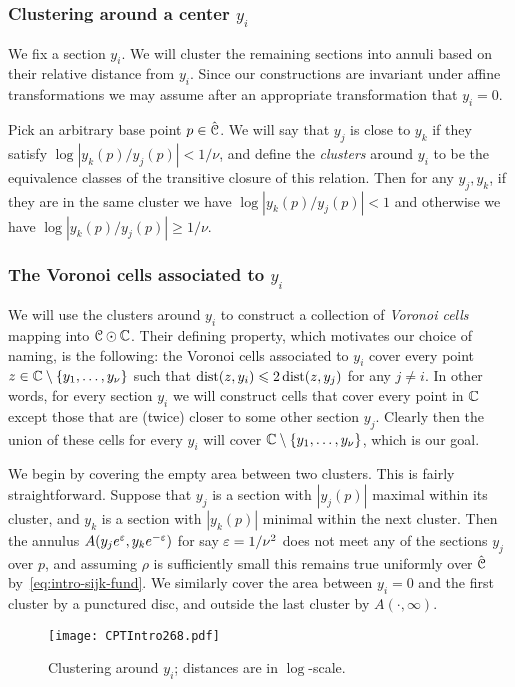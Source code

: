 \documentclass[reqno]{amsart}
\renewcommand\ge{\geqslant} \renewcommand\le{\leqslant}
\renewcommand\~[1]{\widetilde{#1}}
\begin{document}
\subsubsection{Clustering around a center $y_i$}

We fix a section $y_i$. We will cluster the remaining sections into
annuli based on their relative distance from $y_i$. Since our
constructions are invariant under affine transformations we may assume
after an appropriate transformation that $y_i=0$.

Pick an arbitrary base point $p\in\hat{{\mathcal C}}$. We will say that $y_j$ is
close to $y_k$ if they satisfy $\log|y_k(p)/y_j(p)|<1/\nu$, and define
the \emph{clusters} around $y_i$ to be the equivalence classes of the
transitive closure of this relation. Then for any $y_j,y_k$, if they
are in the same cluster we have $\log|y_k(p)/y_j(p)|<1$ and otherwise
we have $\log|y_k(p)/y_j(p)|\ge1/\nu$.
  
\subsubsection{The Voronoi cells associated to $y_i$}

We will use the clusters around $y_i$ to construct a collection of
\emph{Voronoi cells} mapping into ${\mathcal C}\odot{\mathbb C}$. Their defining
property, which motivates our choice of naming, is the following: the
Voronoi cells associated to $y_i$ cover every point
$z\in{\mathbb C}\setminus\{y_1,\ldots,y_\nu\}$ such that
$\dist(z,y_i)\le 2\dist(z,y_j)$ for any $j\neq i$. In other words, for
every section $y_i$ we will construct cells that cover every point in
${\mathbb C}$ except those that are (twice) closer to some other section
$y_j$. Clearly then the union of these cells for every $y_i$ will
cover ${\mathbb C}\setminus\{y_1,\ldots,y_\nu\}$, which is our goal.

We begin by covering the empty area between two clusters. This is
fairly straightforward. Suppose that $y_j$ is a section with
$|y_j(p)|$ maximal within its cluster, and $y_k$ is a section with
$|y_k(p)|$ minimal within the next cluster. Then the annulus
$A(y_je^\varepsilon,y_ke^{-\varepsilon})$ for say $\varepsilon=1/\nu^2$ does not meet any of the
sections $y_j$ over $p$, and assuming $\rho$ is sufficiently small
this remains true uniformly over $\hat{{\mathcal C}}$
by~\eqref{eq:intro-sijk-fund}. We similarly cover the area between
$y_i=0$ and the first cluster by a punctured disc, and outside the
last cluster by $A(\cdot,\infty)$.

\begin{figure}
  \centering
  \texttt{[image: CPTIntro268.pdf]}
  \caption{Clustering around $y_i$; distances are in $\log$-scale.}
  \label{fig:clusters-yi}
\end{figure}
\end{document}
